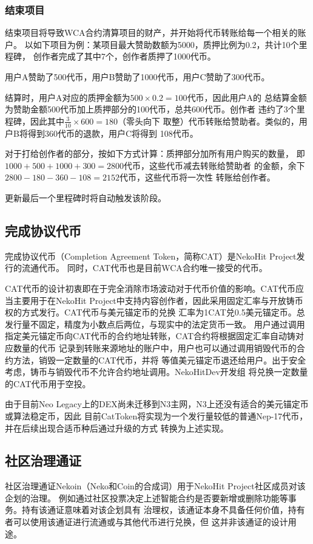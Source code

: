 \subsubsection{结束项目}

结束项目将导致WCA合约清算项目的财产，并开始将代币转账给每一个相关的账户。
以如下项目为例：某项目最大赞助数额为5000，质押比例为0.2，共计10个里程碑，
创作者完成了其中7个，创作者质押了1000代币。

用户A赞助了500代币，用户B赞助了1000代币，用户C赞助了300代币。

结算时，用户A对应的质押金额为$500 \times 0.2 = 100$代币，因此用户A的
总结算金额为赞助金额500代币加上质押部分的100代币，总共600代币。创作者
违约了3个里程碑，因此其中$\frac{3}{10} \times 600 = 180$（零头向下
取整）代币转账给赞助者。类似的，用户B将得到360代币的退款，用户C将得到
108代币。

对于打给创作者的部分，按如下方式计算：质押部分加所有用户购买的数量，
即$1000 + 500 + 1000 + 300 = 2800$代币，这些代币减去转账给赞助者
的金额，余下$2800 - 180 - 360 - 108 = 2152$代币，这些代币将一次性
转账给创作者。

更新最后一个里程碑时将自动触发该阶段。

\subsection{完成协议代币}\label{subsec:cat}

完成协议代币（Completion Agreement Token，简称CAT）是NekoHit Project发行的流通代币。
同时，CAT代币也是目前WCA合约唯一接受的代币。

CAT代币的设计初衷即在于完全消除市场波动对于代币价值的影响。CAT代币应当主要用于在NekoHit
Project中支持内容创作者，因此采用固定汇率与开放铸币权的方式发行。CAT代币与美元锚定币的兑换
汇率为1CAT兑0.5美元锚定币。总发行量不固定，精度为小数点后两位，与现实中的法定货币一致。
用户通过调用指定美元锚定币向CAT代币的合约地址转账，CAT合约将根据固定汇率自动铸对应数量的代币
记录到转账来源地址的账户中，用户也可以通过调用销毁代币的合约方法，销毁一定数量的CAT代币，并将
等值美元锚定币退还给用户。出于安全考虑，铸币与销毁代币不允许合约地址调用。NekoHitDev开发组
将兑换一定数量的CAT代币用于空投。

由于目前Neo Legacy上的DEX尚未迁移到N3主网，N3上还没有适合的美元锚定币或算法稳定币，因此
目前CatToken将实现为一个发行量较低的普通Nep-17代币，并在后续出现合适币种后通过升级的方式
转换为上述实现。

\subsection{社区治理通证}\label{subsec:nekoin}

社区治理通证Nekoin（Neko和Coin的合成词）用于NekoHit Project社区成员对该企划的治理。
例如通过社区投票决定上述智能合约是否要新增或删除功能等事务。持有该通证意味着对该企划具有
治理权，该通证本身不具备任何价值，持有者可以使用该通证进行流通或与其他代币进行兑换，但
这并非该通证的设计用途。

